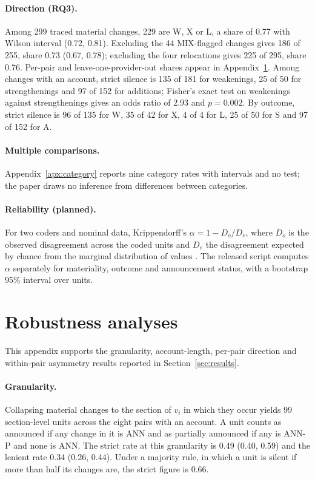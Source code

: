 \documentclass{article}
\begin{document}
\paragraph{Direction (RQ3).} Among 299 traced material changes, 229 are W, X or L, a share of 0.77 with Wilson interval (0.72, 0.81). Excluding the 44 MIX-flagged changes gives 186 of 255, share 0.73 (0.67, 0.78); excluding the four relocations gives 225 of 295, share 0.76. Per-pair and leave-one-provider-out shares appear in Appendix~\ref{apx:robust}. Among changes with an account, strict silence is 135 of 181 for weakenings, 25 of 50 for strengthenings and 97 of 152 for additions; Fisher's exact test on weakenings against strengthenings gives an odds ratio of 2.93 and $p = 0.002$. By outcome, strict silence is 96 of 135 for W, 35 of 42 for X, 4 of 4 for L, 25 of 50 for S and 97 of 152 for A.
\paragraph{Multiple comparisons.} Appendix~\ref{apx:category} reports nine category rates with intervals and no test; the paper draws no inference from differences between categories.
\paragraph{Reliability (planned).} For two coders and nominal data, Krippendorff's $\alpha = 1 - D_o / D_e$, where $D_o$ is the observed disagreement across the coded units and $D_e$ the disagreement expected by chance from the marginal distribution of values \citep{krippendorff2019content}. The released script computes $\alpha$ separately for materiality, outcome and announcement status, with a bootstrap 95\% interval over units.

\section{Robustness analyses}
\label{apx:robust}
This appendix supports the granularity, account-length, per-pair direction and within-pair asymmetry results reported in Section~\ref{sec:results}.
\paragraph{Granularity.} Collapsing material changes to the section of $v_i$ in which they occur yields 99 section-level units across the eight pairs with an account. A unit counts as announced if any change in it is ANN and as partially announced if any is ANN-P and none is ANN. The strict rate at this granularity is 0.49 (0.40, 0.59) and the lenient rate 0.34 (0.26, 0.44). Under a majority rule, in which a unit is silent if more than half its changes are, the strict figure is 0.66.
\end{document}
